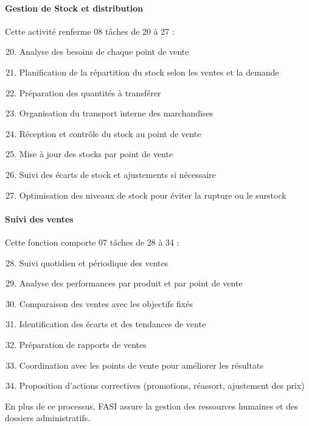\documentclass[a4paper,12pt]{report}
\begin{document}
\paragraph{Gestion de Stock et distribution}

Cette activité renferme 08 tâches de 20 à 27 :

\begin{enumerate}
\setcounter{enumi}{19}
\item Analyse des besoins de chaque point de vente
\item Planification de la répartition du stock selon les ventes et la demande
\item Préparation des quantités à transférer
\item Organisation du transport interne des marchandises
\item Réception et contrôle du stock au point de vente
\item Mise à jour des stocks par point de vente
\item Suivi des écarts de stock et ajustements si nécessaire
\item Optimisation des niveaux de stock pour éviter la rupture ou le surstock
\end{enumerate}

\paragraph{Suivi des ventes}

Cette fonction comporte 07 tâches de 28 à 34 :

\begin{enumerate}
\setcounter{enumi}{27}
\item Suivi quotidien et périodique des ventes
\item Analyse des performances par produit et par point de vente
\item Comparaison des ventes avec les objectifs fixés
\item Identification des écarts et des tendances de vente
\item Préparation de rapports de ventes
\item Coordination avec les points de vente pour améliorer les résultats
\item Proposition d'actions correctives (promotions, réassort, ajustement des prix)
\end{enumerate}

En plus de ce processus, FASI assure la gestion des ressources humaines et des dossiers administratifs.
\end{document}
